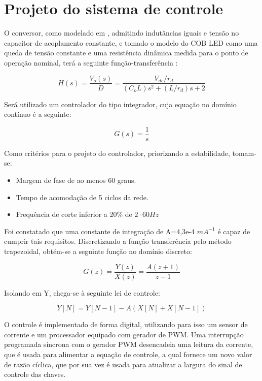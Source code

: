\documentclass[
        12pt,
        openany, %
        oneside, %
        a4paper,			
        english,			
        brazil
        ]{abntbibufjf}
\begin{document}
\section{Projeto do sistema de controle}

O conversor, como modelado em \cite{denis}, admitindo indutâncias iguais e tensão no capacitor de acoplamento constante, e tomado o modelo do COB LED como uma queda de tensão constante e uma resistência dinâmica medida para o ponto de operação nominal, terá a seguinte função-transferência \cite{denis}:

\begin{equation}
H(s)=\frac{V_o(s)}{D}=\frac{V_{dc}/r_d}{(C_oL)s^2+(L/r_d)s+2}
\end{equation}

Será utilizado um controlador do tipo integrador, cuja equação no domínio contínuo é a seguinte:

\begin{equation}
G(s) = \frac{1}{s}
\end{equation}

Como critérios para o projeto do controlador, priorizando a estabilidade, tomam-se:

\begin{itemize}
	\item Margem de fase de ao menos 60 graus.
	\item Tempo de acomodação de 5 ciclos da rede.
	\item Frequência de corte inferior a 20\% de $2 \cdot 60Hz$
\end{itemize}

Foi constatado que uma constante de integração de A=4,3e-4 $mA^{-1}$ é capaz de cumprir tais requisitos. Discretizando a função transferência pelo método trapezoidal, obtém-se a seguinte função no domínio discreto:

\begin{equation}
G(z) = \frac{Y(z)}{X(z)} = \frac{A(z+1)}{z-1}
\end{equation}

Isolando em Y, chega-se à seguinte lei de controle:

\begin{equation}
Y[N] = Y[N-1] - A(X[N] + X[N-1])
\end{equation}

O controle é implementado de forma digital, utilizando para isso um sensor de corrente e um processador equipado com gerador de PWM. Uma interrupção programada síncrona com o gerador PWM desencadeia uma leitura da corrente, que é usada para alimentar a equação de controle, a qual fornece um novo valor de razão cíclica, que por sua vez é usada para atualizar a largura do sinal de controle das chaves.
\end{document}
